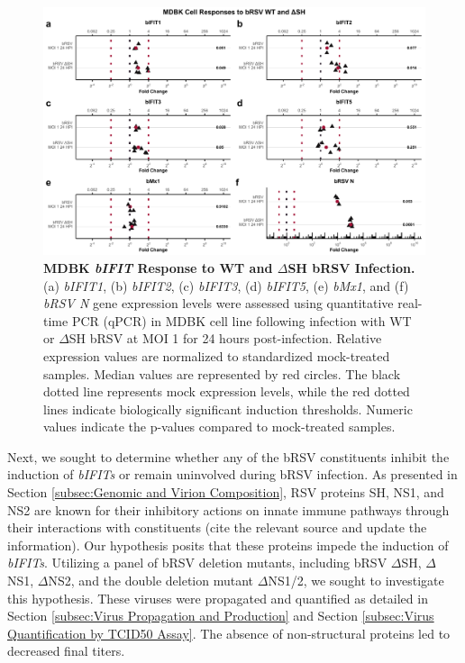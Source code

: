 \begin{figure}
    \centering
    \includegraphics[width=1\linewidth]{07. Chapter 2/Figs/02. Induction/05. mdbk_brsv_moi1_dsh.pdf}
    \caption[MDBK \textit{bIFIT} Response to WT and \(\Delta\)SH bRSV Infection.]{\textbf{MDBK \textit{bIFIT} Response to WT and \(\Delta\)SH bRSV Infection.} (a) \textit{bIFIT1}, (b) \textit{bIFIT2}, (c) \textit{bIFIT3}, (d) \textit{bIFIT5}, (e) \textit{bMx1}, and (f) \textit{bRSV N} gene expression levels were assessed using quantitative real-time PCR (qPCR) in MDBK cell line following infection with WT or \(\Delta\)SH bRSV at MOI 1 for 24 hours post-infection. Relative expression values are normalized to standardized mock-treated samples. Median values are represented by red circles. The black dotted line represents mock expression levels, while the red dotted lines indicate biologically significant induction thresholds. Numeric values indicate the p-values compared to mock-treated samples.}
    \label{fig:MDBK responses to dSH}
\end{figure}

Next, we sought to determine whether any of the bRSV constituents inhibit the induction of \textit{bIFITs} or remain uninvolved during bRSV infection. As presented in Section \ref{subsec:Genomic and Virion Composition}, RSV proteins SH, NS1, and NS2 are known for their inhibitory actions on innate immune pathways through their interactions with constituents (cite the relevant source and update the information). Our hypothesis posits that these proteins impede the induction of \textit{bIFITs}. Utilizing a panel of bRSV deletion mutants, including bRSV \(\Delta\)SH, \(\Delta\)NS1, \(\Delta\)NS2, and the double deletion mutant \(\Delta\)NS1/2, we sought to investigate this hypothesis. These viruses were propagated and quantified as detailed in Section \ref{subsec:Virus Propagation and Production} and Section \ref{subsec:Virus Quantification by TCID50 Assay}. The absence of non-structural proteins led to decreased final titers.

